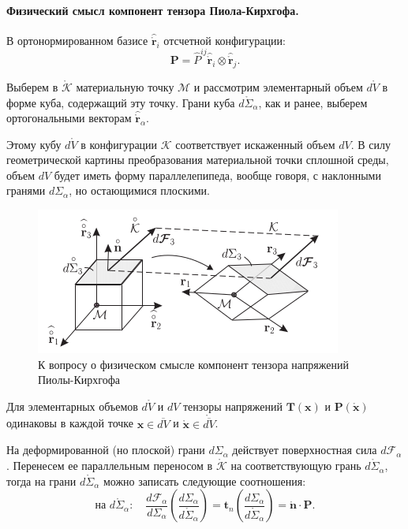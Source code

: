 \paragraph{Физический смысл компонент тензора Пиола-Кирхгофа.}

В ортонормированном базисе $\widehat{\mathring{\mathbf{r}}}_i$ отсчетной конфигурации:
\begin{equation*}
	\mathbf{P} = \widehat{P}^{ij} \widehat{\mathring{\mathbf{r}}}_i \otimes \widehat{\mathring{\mathbf{r}}}_j.
\end{equation*}

Выберем в $\mathring{\mathcal{K}}$ материальную точку $\mathcal{M}$ и рассмотрим элементарный объем $d\mathring{V}$ в форме куба, содержащий эту точку. Грани куба $d\mathring{\Sigma}_{\alpha}$, как и ранее, выберем ортогональными векторам $\widehat{\mathring{\mathbf{r}}}_{\alpha}$.

Этому кубу $d\mathring{V}$ в конфигурации $\mathcal{K}$ соответствует искаженный объем $dV$. В силу геометрической картины преобразования материальной точки сплошной среды, объем $dV$ будет иметь форму параллелепипеда, вообще говоря, с наклонными гранями $d\Sigma_{\alpha}$, но остающимися плоскими.

\begin{figure}[H]
	\centering
	\includegraphics[width=0.6\linewidth]{img/que18_3}
	\caption{К вопросу о физическом смысле компонент тензора напряжений Пиолы-Кирхгофа}
	\label{fig:que18_3}
\end{figure}

 Для элементарных объемов $d\mathring{V}$ и $dV$ тензоры напряжений $\mathbf{T}(\mathbf{x})$ и $\mathbf{P}(\mathring{\mathbf{x}})$ одинаковы в каждой точке $\mathbf{x} \in \overline{dV}$ и $\mathring{\mathbf{x}} \in \mathring{\overline{dV}}$. 
 
 На деформированной (но плоской) грани $d\Sigma_{\alpha}$ действует поверхностная сила $d\mathcal{F}_{\alpha}$. Перенесем ее параллельным переносом в $\mathring{\mathcal{K}}$ на соответствующую грань $d\mathring{\Sigma}_{\alpha}$, тогда на грани $d\mathring{\Sigma}_{\alpha}$ можно записать следующие соотношения:
 \begin{equation*}
 	\text{на } d\mathring{\Sigma}_{\alpha} : \quad \frac{d\mathcal{F}_{\alpha}}{d\Sigma_{\alpha}} \left(\frac{d\Sigma_{\alpha}}{d\mathring{\Sigma}_{\alpha}}\right) = \mathbf{t}_n \left(\frac{d\Sigma_{\alpha}}{d\mathring{\Sigma}_{\alpha}}\right) = \mathring{\mathbf{n}} \cdot \mathbf{P}.
 \end{equation*}
 
